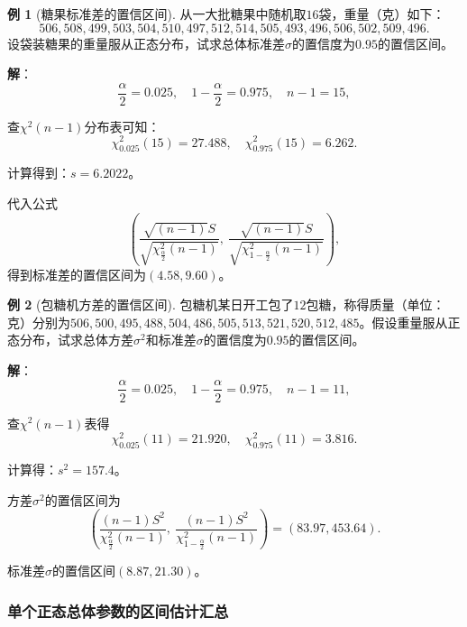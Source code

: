 \documentclass[11pt,a4paper]{report}
\theoremstyle{definition}
\newtheorem{example}{例}[chapter]
\begin{document}
\begin{example}[糖果标准差的置信区间]
从一大批糖果中随机取$16$袋，重量（克）如下：
\[
506,508,499,503,504,510,497,512,514,505,493,496,506,502,509,496.
\]
设袋装糖果的重量服从正态分布，试求总体标准差$\sigma$的置信度为$0.95$的置信区间。

\textbf{解}：
\[
\frac{\alpha}{2}=0.025,\quad 1-\frac{\alpha}{2}=0.975,\quad n-1=15,
\]

查$\chi^{2}(n-1)$分布表可知：
\[
\chi_{0.025}^{2}(15)=27.488,\quad \chi_{0.975}^{2}(15)=6.262.
\]

计算得到：$s=6.2022$。

代入公式
\[
\left(\frac{\sqrt{(n-1)}S}{\sqrt{\chi_{\frac{\alpha}{2}}^{2}(n-1)}},\ \frac{\sqrt{(n-1)}S}{\sqrt{\chi_{1-\frac{\alpha}{2}}^{2}(n-1)}}\right),
\]
得到标准差的置信区间为$(4.58,9.60)$。
\end{example}

\begin{example}[包糖机方差的置信区间]
包糖机某日开工包了$12$包糖，称得质量（单位：克）分别为$506,500,495,488,504,486,505,513,521,520,512,485$。假设重量服从正态分布，试求总体方差$\sigma^{2}$和标准差$\sigma$的置信度为$0.95$的置信区间。

\textbf{解}：
\[
\frac{\alpha}{2}=0.025,\quad 1-\frac{\alpha}{2}=0.975,\quad n-1=11,
\]

查$\chi^{2}(n-1)$表得
\[
\chi_{0.025}^{2}(11)=21.920,\quad \chi_{0.975}^{2}(11)=3.816.
\]

计算得：$s^{2}=157.4$。

方差$\sigma^{2}$的置信区间为
\[
\left(\frac{(n-1)S^{2}}{\chi_{\frac{\alpha}{2}}^{2}(n-1)},\ \frac{(n-1)S^{2}}{\chi_{1-\frac{\alpha}{2}}^{2}(n-1)}\right)=(83.97,453.64).
\]

标准差$\sigma$的置信区间$(8.87,21.30)$。
\end{example}

\subsubsection*{单个正态总体参数的区间估计汇总}
\end{document}
